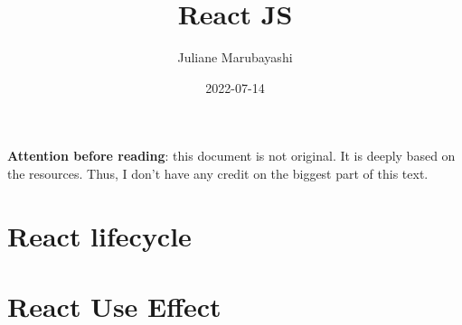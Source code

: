 \documentclass{article}
\title{React JS}
\author{Juliane Marubayashi}
\date{ 2022-07-14 }
\begin{document}
    \maketitle
    \newpage
    \tableofcontents
    \newpage
    \textbf{Attention before reading}: this document is not original. It is deeply based on the resources.
    Thus, I don't have any credit on the biggest part of this text. 
    \section{React lifecycle}
    
    \section{React Use Effect}
    
\end{document}

